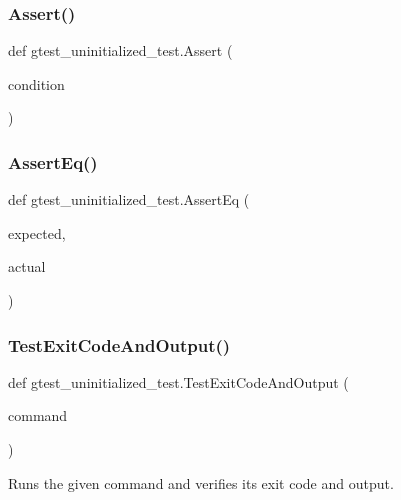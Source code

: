 \subsubsection{\texorpdfstring{Assert()}{Assert()}}
{\footnotesize\ttfamily def gtest\+\_\+uninitialized\+\_\+test.\+Assert (\begin{DoxyParamCaption}\item[{}]{condition }\end{DoxyParamCaption})}

\mbox{\label{namespacegtest__uninitialized__test_a11a319d03e3ed2f94b95f7166ac1423b}} 
\subsubsection{\texorpdfstring{Assert\+Eq()}{AssertEq()}}
{\footnotesize\ttfamily def gtest\+\_\+uninitialized\+\_\+test.\+Assert\+Eq (\begin{DoxyParamCaption}\item[{}]{expected,  }\item[{}]{actual }\end{DoxyParamCaption})}

\mbox{\label{namespacegtest__uninitialized__test_acb743a321be1696fc72ffbdcac897613}} 
\subsubsection{\texorpdfstring{Test\+Exit\+Code\+And\+Output()}{TestExitCodeAndOutput()}}
{\footnotesize\ttfamily def gtest\+\_\+uninitialized\+\_\+test.\+Test\+Exit\+Code\+And\+Output (\begin{DoxyParamCaption}\item[{}]{command }\end{DoxyParamCaption})}

\begin{DoxyVerb}Runs the given command and verifies its exit code and output.\end{DoxyVerb}
 

